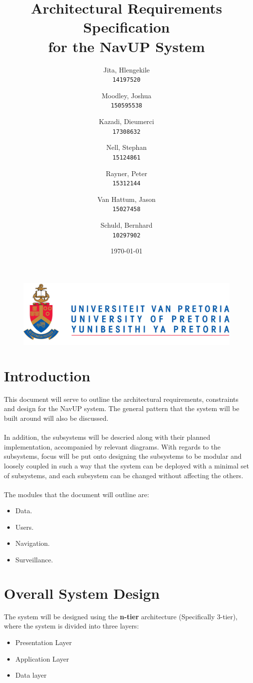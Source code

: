 \documentclass[english]{article}
\author{
	Jita, Hlengekile\\
	\texttt{14197520}
	\and
	Moodley, Joshua\\
	\texttt{150595538}
	\and
	Kazadi, Dieumerci\\
	\texttt{17308632}
	\and
	Nell, Stephan\\
	\texttt{15124861}
	\and
	Rayner, Peter\\
	\texttt{15312144}
	\and
	Van Hattum, Jason\\
	\texttt{15027458}
	\and
	Schuld, Bernhard\\
	\texttt{10297902}
}
\title{Architectural Requirements Specification\\
	for the NavUP System\\
	}
\date{\today}
\begin{document}
    \fboxsep=2mm

	\maketitle
	\begin{figure}[!t]
		\includegraphics{up_logo.png}
	\end{figure}
	\newpage

	\tableofcontents
	\newpage



	\section{Introduction}

		This document will serve to outline the architectural requirements, constraints and design for the NavUP system. The general pattern that the system will be built around will also be discussed.\\
        \\
		In addition, the subsystems will be descried along with their planned implementation, accompanied by relevant diagrams. With regards to the subsystems, focus will be put onto designing the subsystems to be modular and loosely coupled in such a way that the system can be deployed with a minimal set of subsystems, and each subsystem can be changed without affecting the others.\\
		\\
		The modules that the document will outline are:
		\begin{itemize}
		    \item Data.
		    \item Users.
		    \item Navigation.
		    \item Surveillance.
		\end{itemize}

	\section{Overall System Design}
	    The system will be designed using the \textbf{n-tier} architecture (Specifically 3-tier), where the system is divided into three layers:
	    \begin{itemize}
	        \item Presentation Layer
	        \item Application Layer
	        \item Data layer
	    \end{itemize}
\end{document}
